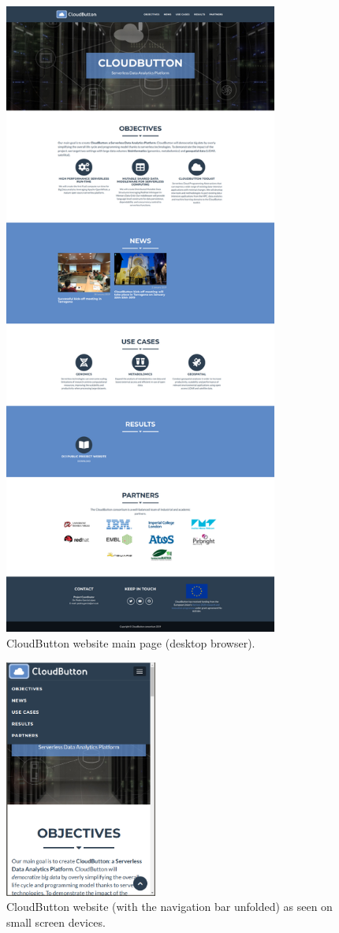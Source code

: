 \documentclass[a4paper,11pt]{article}
\numberwithin{table}{subsection} %
\begin{document}
\begin{figure}[hbt!]
\centering
\includegraphics[width=9cm]{figures/website_browser.png}
\caption{CloudButton website main page (desktop browser).}
\label{fig:desktop}
\end{figure}

\begin{figure}[hbt!]
\centering
\includegraphics[width=5cm]{figures/website_mobile.png}
\caption{CloudButton website (with the navigation bar unfolded) as seen on small screen devices.}
\label{fig:mobile}
\end{figure}
\end{document}
